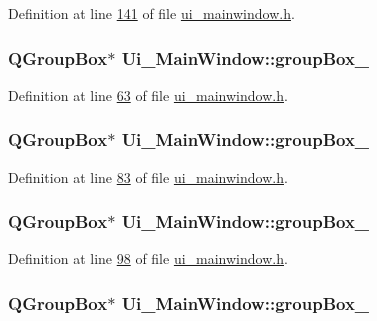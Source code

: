 Definition at line \hyperlink{a00052_source_l00141}{141} of file \hyperlink{a00052_source}{ui\+\_\+mainwindow.\+h}.

\hypertarget{a00027_a320d3d7ba1cb8fff7b7b95923ed10f5e}{
\subsubsection[{group\+Box\+\_\+3}]{\setlength{\rightskip}{0pt plus 5cm}Q\+Group\+Box$\ast$ Ui\+\_\+\+Main\+Window\+::group\+Box\+\_}}\label{a00027_a320d3d7ba1cb8fff7b7b95923ed10f5e}


Definition at line \hyperlink{a00052_source_l00063}{63} of file \hyperlink{a00052_source}{ui\+\_\+mainwindow.\+h}.

\hypertarget{a00027_ad8a919e5634add9c41bfc319cb9fd338}{
\subsubsection[{group\+Box\+\_\+4}]{\setlength{\rightskip}{0pt plus 5cm}Q\+Group\+Box$\ast$ Ui\+\_\+\+Main\+Window\+::group\+Box\+\_}}\label{a00027_ad8a919e5634add9c41bfc319cb9fd338}


Definition at line \hyperlink{a00052_source_l00083}{83} of file \hyperlink{a00052_source}{ui\+\_\+mainwindow.\+h}.

\hypertarget{a00027_a40a9931365fd3679efec4f0112073db2}{
\subsubsection[{group\+Box\+\_\+6}]{\setlength{\rightskip}{0pt plus 5cm}Q\+Group\+Box$\ast$ Ui\+\_\+\+Main\+Window\+::group\+Box\+\_}}\label{a00027_a40a9931365fd3679efec4f0112073db2}


Definition at line \hyperlink{a00052_source_l00098}{98} of file \hyperlink{a00052_source}{ui\+\_\+mainwindow.\+h}.

\hypertarget{a00027_a269faaef68e4ad4784635810fcae5698}{
\subsubsection[{group\+Box\+\_\+7}]{\setlength{\rightskip}{0pt plus 5cm}Q\+Group\+Box$\ast$ Ui\+\_\+\+Main\+Window\+::group\+Box\+\_}}\label{a00027_a269faaef68e4ad4784635810fcae5698}


